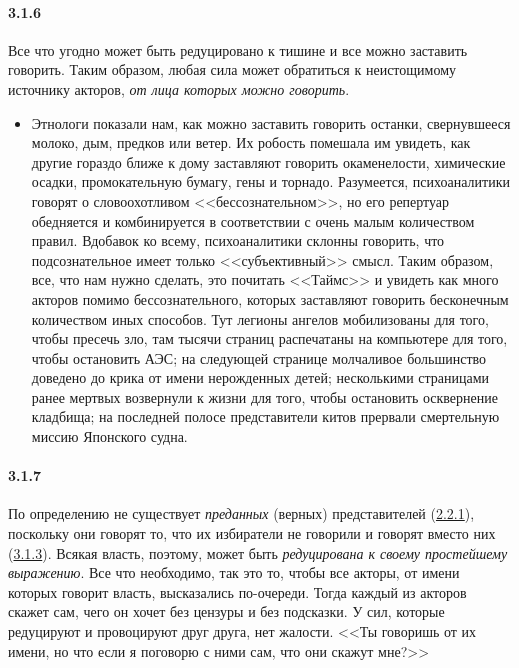 \paragraph{3.1.6}\hypertarget{par:3.1.6}{} Все что угодно может быть редуцировано к тишине и все можно заставить говорить. Таким образом, любая сила может обратиться к неистощимому источнику акторов, {\itshape от лица которых можно говорить}.
	\begin{itemize}
	\item 
	Этнологи показали нам, как можно заставить говорить останки, свернувшееся молоко, дым, предков или ветер. Их робость помешала им увидеть, как другие гораздо ближе к дому заставляют говорить окаменелости, химические осадки, промокательную бумагу, гены и торнадо. Разумеется, психоаналитики говорят о словоохотливом <<бессознательном>>, но его репертуар обедняется и комбинируется в соответствии с очень малым количеством правил. Вдобавок ко всему, психоаналитики склонны говорить, что подсознательное имеет только <<субъективный>> смысл. Таким образом, все, что нам нужно сделать, это почитать <<Таймс>> и увидеть как много акторов помимо бессознательного, которых заставляют говорить бесконечным количеством иных способов. Тут легионы ангелов мобилизованы для того, чтобы пресечь зло, там тысячи страниц распечатаны на компьютере для того, чтобы остановить АЭС; на следующей странице молчаливое большинство доведено до крика от имени нерожденных детей; несколькими страницами ранее мертвых возвернули к жизни для того, чтобы остановить осквернение кладбища; на последней полосе представители китов прервали смертельную миссию Японского судна.
	\end{itemize}

\paragraph{3.1.7}\hypertarget{par:3.1.7}{} По определению не существует {\itshape преданных} (верных) представителей (\hyperlink{par:2.2.1}{2.2.1}), поскольку они говорят то, что их избиратели не говорили и говорят вместо них (\hyperlink{par:3.1.3}{3.1.3}). Всякая власть, поэтому, может быть {\itshape редуцирована к своему простейшему выражению}. Все что необходимо, так это то, чтобы все акторы, от имени которых говорит власть, высказались по-очереди. Тогда каждый из акторов скажет сам, чего он хочет без цензуры и без подсказки. У сил, которые редуцируют и провоцируют друг друга, нет жалости. <<Ты говоришь от их имени, но что если я поговорю с ними сам, что они скажут мне?>>

